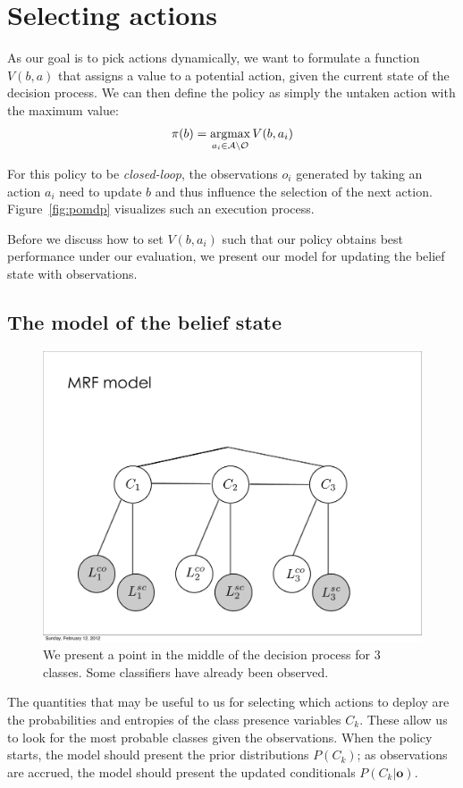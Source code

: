 \section{Selecting actions} \label{sec:value}
As our goal is to pick actions dynamically, we want to formulate a function $V(b,a)$  that assigns a value to a potential action, given the current state of the decision process.
We can then define the policy as simply the untaken action with the maximum value:
\begin{align}
\pi(b) = \argmax_{a_i \in \mathcal{A} \setminus \mathcal{O}} V(b,a_i)
\end{align}

For this policy to be \emph{closed-loop}, the observations $o_i$ generated by taking an action $a_i$ need to update $b$ and thus influence the selection of the next action.
Figure~\ref{fig:pomdp} visualizes such an execution process.

Before we discuss how to set $V(b,a_i)$ such that our policy obtains best performance under our evaluation, we present our model for updating the belief state with observations.

\subsection{The model of the belief state}
\begin{figure}[h!]
\centering
\includegraphics[width=0.56\linewidth]{figures/inf_model_mrf.pdf}
\caption{
We present a point in the middle of the decision process for 3 classes.
Some classifiers have already been observed.
}
\label{fig:model}
\end{figure}

The quantities that may be useful to us for selecting which actions to deploy are the probabilities and entropies of the class presence variables $C_k$.
These allow us to look for the most probable classes given the observations.
When the policy starts, the model should present the prior distributions $P(C_k)$; as observations are accrued, the model should present the updated conditionals $P(C_k|\mathbf{o})$.

